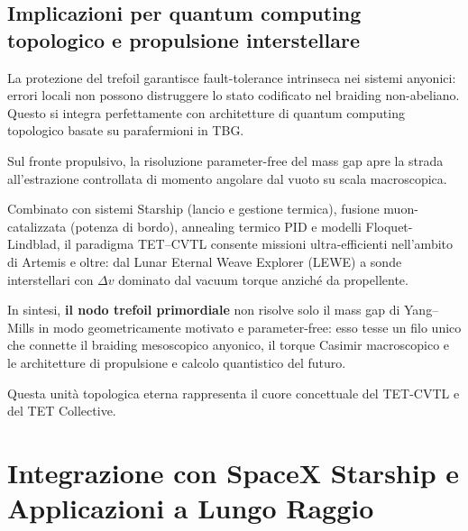 \documentclass[11pt,a4paper]{article}
\theoremstyle{plain}
\theoremstyle{definition}
\begin{document}
\vspace{0.4cm}

\subsection{Implicazioni per quantum computing topologico e propulsione interstellare}

\vspace{0.2cm}

La protezione del trefoil garantisce fault-tolerance intrinseca nei sistemi anyonici: errori locali non possono distruggere lo stato codificato nel braiding non-abeliano. Questo si integra perfettamente con architetture di quantum computing topologico basate su parafermioni in TBG.

\vspace{0.3cm}

Sul fronte propulsivo, la risoluzione parameter-free del mass gap apre la strada all'estrazione controllata di momento angolare dal vuoto su scala macroscopica. 


\vspace{0.3cm}

Combinato con sistemi Starship (lancio e gestione termica), fusione muon-catalizzata (potenza di bordo), annealing termico PID e modelli Floquet-Lindblad, il paradigma TET--CVTL consente missioni ultra-efficienti nell'ambito di Artemis e oltre: dal Lunar Eternal Weave Explorer (LEWE) a sonde interstellari con \(\Delta v\) dominato dal vacuum torque anziché da propellente.


\vspace{0.5cm}

In sintesi, \textbf{il nodo trefoil primordiale} non risolve solo il mass gap di Yang--Mills in modo geometricamente motivato e parameter-free: esso tesse un filo unico che connette il braiding mesoscopico anyonico, il torque Casimir macroscopico e le architetture di propulsione e calcolo quantistico del futuro. 

\vspace{0.3cm}


Questa unità topologica eterna rappresenta il cuore concettuale del TET-CVTL e del TET Collective.





\vspace{0.5cm}



\section{Integrazione con SpaceX Starship e Applicazioni a Lungo Raggio}
\end{document}
